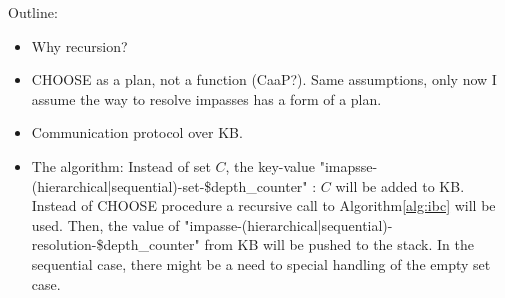 \documentclass[3p,times]{elsarticle} %
\begin{document}
Outline:
\begin{itemize}
  \item Why recursion?
  \item CHOOSE as a plan, not a function (CaaP?). Same assumptions, only now I assume the way to resolve impasses has a form of a plan.
  \item Communication protocol over KB.
  \item The algorithm: Instead of set $C$, the key-value "imapsse-(hierarchical|sequential)-set-\$depth\_counter" : $C$ will be added to KB. Instead of CHOOSE procedure a recursive call to Algorithm\ref{alg:ibc} will be used. Then, the value of "impasse-(hierarchical|sequential)-resolution-\$depth\_counter" from KB will be pushed to the stack. In the sequential case, there might be a need to special handling of the empty set case.
\end{itemize}
\end{document}
